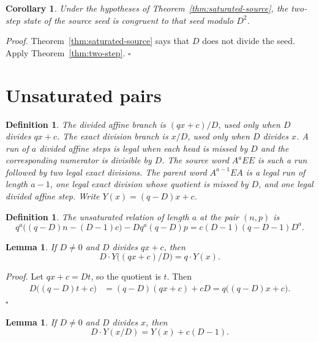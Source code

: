 \documentclass[11pt,letterpaper]{article}
\newtheorem{lemma}[theorem]{Lemma}
\newtheorem{corollary}[theorem]{Corollary}
\newtheorem{definition}[theorem]{Definition}
\newenvironment{proof}{\noindent\textit{Proof.}}{\hfill\(\square\)}
\begin{document}
\begin{corollary}
\label{cor:seed-two-step}
Under the hypotheses of Theorem~\ref{thm:saturated-source}, the two-step state of the source seed is congruent to that seed modulo \(D^2\).
\end{corollary}

\begin{proof}
Theorem~\ref{thm:saturated-source} says that \(D\) does not divide the seed. Apply Theorem~\ref{thm:two-step}.
\end{proof}

\section{Unsaturated pairs}

\begin{definition}
The divided affine branch is \((qx+c)/D\), used only when \(D\) divides \(qx+c\). The exact division branch is \(x/D\), used only when \(D\) divides \(x\). A run of \(a\) divided affine steps is legal when each head is missed by \(D\) and the corresponding numerator is divisible by \(D\). The source word \(A^aEE\) is such a run followed by two legal exact divisions. The parent word \(A^{a-1}EA\) is a legal run of length \(a-1\), one legal exact division whose quotient is missed by \(D\), and one legal divided affine step. Write \(Y(x)=(q-D)x+c\).
\end{definition}

\begin{definition}
\label{def:unsaturated-relation}
The unsaturated relation of length \(a\) at the pair \((n,p)\) is
\[
q^a\bigl((q-D)n-(D-1)c\bigr)-Dq^a(q-D)p
=c(D-1)(q-D-1)D^a.
\]
\end{definition}

\begin{lemma}
\label{lem:affine-y}
If \(D\neq 0\) and \(D\) divides \(qx+c\), then
\[
D\cdot Y\bigl((qx+c)/D\bigr)=q\cdot Y(x).
\]
\end{lemma}

\begin{proof}
Let \(qx+c=Dt\), so the quotient is \(t\). Then
\begin{align*}
D\bigl((q-D)t+c\bigr)
&=(q-D)(qx+c)+cD
=q\bigl((q-D)x+c\bigr).
\end{align*}
\end{proof}

\begin{lemma}
\label{lem:exact-y}
If \(D\neq 0\) and \(D\) divides \(x\), then
\[
D\cdot Y(x/D)=Y(x)+c(D-1).
\]
\end{lemma}
\end{document}
